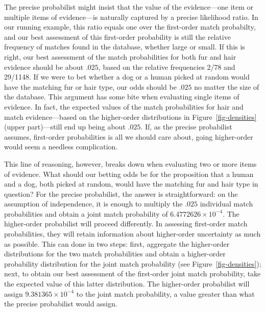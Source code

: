 \documentclass[
  letterpaper,
  DIV=11,
  numbers=noendperiod]{scrartcl}
\begin{document}
The precise probabilist might insist that the value of the
evidence---one item or multiple items of evidence---is naturally
captured by a precise likelihood ratio. In our running example, this
ratio equals one over the first-order match probabilty, and our best
assessment of this first-order probability is still the relative
frequency of matches found in the database, whether large or small. If
this is right, our best assessment of the match probabilities for both
fur and hair evidence should be about \(.025\), based on the relative
frequencies 2/78 and 29/1148. If we were to bet whether a dog or a human
picked at random would have the matching fur or hair type, our odds
should be \(.025\) no matter the size of the database. This argument has
some bite when evaluating single items of evidence. In fact, the
expected values of the match probabilities for hair and match
evidence---based on the higher-order distributions in
Figure~\ref{fig-densities} (upper part)---still end up being about
\(.025\). If, as the precise probabilist assumes, first-order
probabilities is all we should care about, going higher-order would seem
a needless complication.

This line of reasoning, however, breaks down when evaluating two or more
items of evidence. What should our betting odds be for the proposition
that a human and a dog, both picked at random, would have the matching
fur and hair type in question? For the precise probabilist, the answer
is straightforward: on the assumption of independence, it is enough to
multiply the \(.025\) individual match probabilities and obtain a joint
match probability of \ensuremath{6.4772626\times 10^{-4}}. The
higher-order probabilist will proceed differently. In assessing
first-order match probabilities, they will retain information about
higher-order uncertainty as much as possible. This can done in two
steps: first, aggregate the higher-order distributions for the two match
probabilities and obtain a higher-order probability distribution for the
joint match probability (see Figure~\ref{fig-densities}); next, to
obtain our best assessment of the first-order joint match probability,
take the expected value of this latter distribution. The higher-order
probabilist will assign \ensuremath{9.381365\times 10^{-4}} to the joint
match probability, a value greater than what the precise probabilist
would assign.
\end{document}

